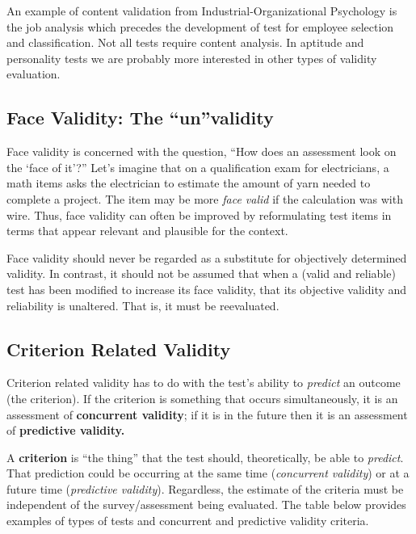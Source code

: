 \documentclass[
  english,
]{book}
\begin{document}
An example of content validation from Industrial-Organizational Psychology is the job analysis which precedes the development of test for employee selection and classification.
Not all tests require content analysis. In aptitude and personality tests we are probably more interested in other types of validity evaluation.

\hypertarget{face-validity-the-unvalidity}{%
\subsection{Face Validity: The ``un''validity}\label{face-validity-the-unvalidity}}

Face validity is concerned with the question, ``How does an assessment look on the `face of it'?'' Let's imagine that on a qualification exam for electricians, a math items asks the electrician to estimate the amount of yarn needed to complete a project. The item may be more \emph{face valid} if the calculation was with wire. Thus, face validity can often be improved by reformulating test items in terms that appear relevant and plausible for the context.

Face validity should never be regarded as a substitute for objectively determined validity. In contrast, it should not be assumed that when a (valid and reliable) test has been modified to increase its face validity, that its objective validity and reliability is unaltered. That is, it must be reevaluated.

\hypertarget{criterion-related-validity}{%
\subsection{Criterion Related Validity}\label{criterion-related-validity}}

Criterion related validity has to do with the test's ability to \emph{predict} an outcome (the criterion). If the criterion is something that occurs simultaneously, it is an assessment of \textbf{concurrent validity}; if it is in the future then it is an assessment of \textbf{predictive validity.}

A \textbf{criterion} is ``the thing'' that the test should, theoretically, be able to \emph{predict}. That prediction could be occurring at the same time (\emph{concurrent validity}) or at a future time (\emph{predictive validity}). Regardless, the estimate of the criteria must be independent of the survey/assessment being evaluated. The table below provides examples of types of tests and concurrent and predictive validity criteria.
\end{document}
